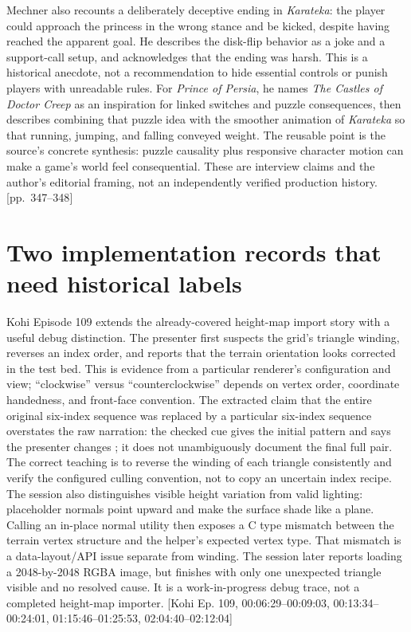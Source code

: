 Mechner also recounts a deliberately deceptive ending in \emph{Karateka}: the player could approach the princess in the wrong stance and be kicked, despite having reached the apparent goal. He describes the disk-flip behavior as a joke and a support-call setup, and acknowledges that the ending was harsh. This is a historical anecdote, not a recommendation to hide essential controls or punish players with unreadable rules. For \emph{Prince of Persia}, he names \emph{The Castles of Doctor Creep} as an inspiration for linked switches and puzzle consequences, then describes combining that puzzle idea with the smoother animation of \emph{Karateka} so that running, jumping, and falling conveyed weight. The reusable point is the source's concrete synthesis: puzzle causality plus responsive character motion can make a game's world feel consequential. These are interview claims and the author's editorial framing, not an independently verified production history. {[}pp.~347--348{]}

\section{Two implementation records that need historical labels}\label{06-engine-ii-ch046-two-implementation-records-that-need-historical-labels}

\hypertarget{06-engine-ii-ch046-two-implementation-records-that-need-historical-labels}{}

Kohi Episode 109 extends the already-covered height-map import story with a useful debug distinction. The presenter first suspects the grid's triangle winding, reverses an index order, and reports that the terrain orientation looks corrected in the test bed. This is evidence from a particular renderer's configuration and view; ``clockwise'' versus ``counterclockwise'' depends on vertex order, coordinate handedness, and front-face convention. The extracted claim that the entire original six-index sequence was replaced by a particular six-index sequence overstates the raw narration: the checked cue gives the initial  pattern and says the presenter changes ; it does not unambiguously document the final full pair. The correct teaching is to reverse the winding of each triangle consistently and verify the configured culling convention, not to copy an uncertain index recipe. The session also distinguishes visible height variation from valid lighting: placeholder normals point upward and make the surface shade like a plane. Calling an in-place normal utility then exposes a C type mismatch between the terrain vertex structure and the helper's expected vertex type. That mismatch is a data-layout/API issue separate from winding. The session later reports loading a 2048-by-2048 RGBA image, but finishes with only one unexpected triangle visible and no resolved cause. It is a work-in-progress debug trace, not a completed height-map importer. {[}Kohi Ep. 109, 00:06:29--00:09:03, 00:13:34--00:24:01, 01:15:46--01:25:53, 02:04:40--02:12:04{]}

